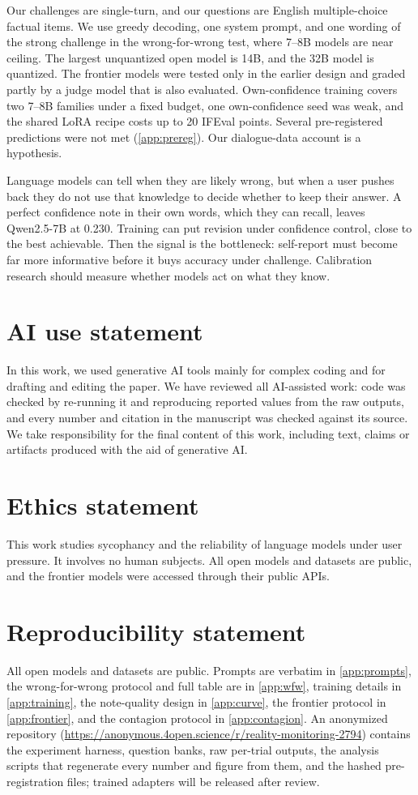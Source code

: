 \documentclass{article} %
\begin{document}
Our challenges are single-turn, and our questions are English multiple-choice factual items. We use greedy decoding, one system prompt, and one wording of the strong challenge in the wrong-for-wrong test, where 7--8B models are near ceiling. The largest unquantized open model is 14B, and the 32B model is quantized. The frontier models were tested only in the earlier design and graded partly by a judge model that is also evaluated. Own-confidence training covers two 7--8B families under a fixed budget, one own-confidence seed was weak, and the shared LoRA recipe costs up to 20 IFEval points. Several pre-registered predictions were not met (\cref{app:prereg}). Our dialogue-data account is a hypothesis.

Language models can tell when they are likely wrong, but when a user pushes back they do not use that knowledge to decide whether to keep their answer. A perfect confidence note in their own words, which they can recall, leaves Qwen2.5-7B at 0.230. Training can put revision under confidence control, close to the best achievable. Then the signal is the bottleneck: self-report must become far more informative before it buys accuracy under challenge. Calibration research should measure whether models act on what they know.

\section*{AI use statement}
In this work, we used generative AI tools mainly for complex coding and for drafting and editing the paper. We have reviewed all AI-assisted work: code was checked by re-running it and reproducing reported values from the raw outputs, and every number and citation in the manuscript was checked against its source. We take responsibility for the final content of this work, including text, claims or artifacts produced with the aid of generative AI.

\section*{Ethics statement}
This work studies sycophancy and the reliability of language models under user pressure. It involves no human subjects. All open models and datasets are public, and the frontier models were accessed through their public APIs.

\section*{Reproducibility statement}
All open models and datasets are public. Prompts are verbatim in \cref{app:prompts}, the wrong-for-wrong protocol and full table are in \cref{app:wfw}, training details in \cref{app:training}, the note-quality design in \cref{app:curve}, the frontier protocol in \cref{app:frontier}, and the contagion protocol in \cref{app:contagion}. An anonymized repository (\url{https://anonymous.4open.science/r/reality-monitoring-2794}) contains the experiment harness, question banks, raw per-trial outputs, the analysis scripts that regenerate every number and figure from them, and the hashed pre-registration files; trained adapters will be released after review.
\end{document}
